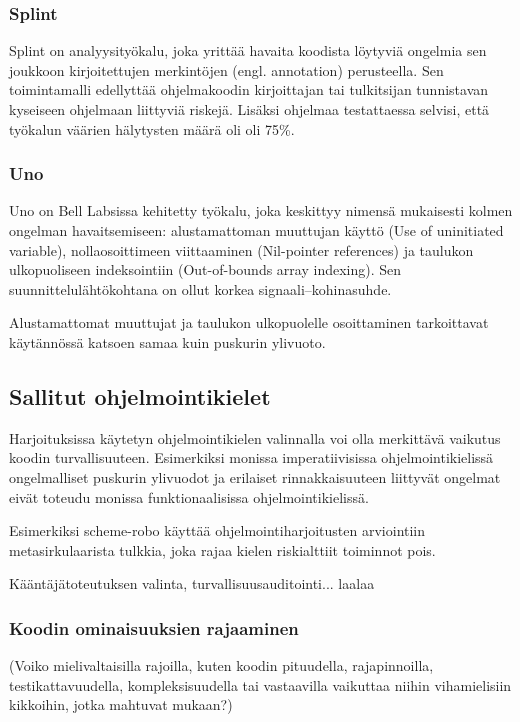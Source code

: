 \subsubsection{Splint}

Splint on analyysityökalu, joka yrittää havaita koodista löytyviä ongelmia sen
joukkoon kirjoitettujen merkintöjen (engl. annotation) perusteella. Sen
toimintamalli edellyttää ohjelmakoodin kirjoittajan tai tulkitsijan tunnistavan
kyseiseen ohjelmaan liittyviä riskejä. Lisäksi ohjelmaa testattaessa selvisi,
että työkalun väärien hälytysten määrä oli oli 75\%.

\subsubsection{Uno}

Uno on Bell Labsissa kehitetty työkalu, joka keskittyy nimensä mukaisesti kolmen
ongelman havaitsemiseen: alustamattoman muuttujan käyttö (Use of uninitiated
variable), nollaosoittimeen viittaaminen (Nil-pointer references) ja taulukon
ulkopuoliseen indeksointiin (Out-of-bounds array indexing). Sen
suunnittelulähtökohtana on ollut korkea signaali--kohinasuhde.

Alustamattomat muuttujat ja taulukon ulkopuolelle osoittaminen tarkoittavat
käytännössä katsoen samaa kuin puskurin ylivuoto.


\subsection{Sallitut ohjelmointikielet}

Harjoituksissa käytetyn ohjelmointikielen valinnalla voi olla merkittävä
vaikutus koodin turvallisuuteen. Esimerkiksi monissa imperatiivisissa
ohjelmointikielissä ongelmalliset puskurin ylivuodot ja erilaiset
rinnakkaisuuteen liittyvät ongelmat eivät toteudu monissa funktionaalisissa
ohjelmointikielissä.

Esimerkiksi scheme-robo käyttää ohjelmointiharjoitusten arviointiin
metasirkulaarista tulkkia, joka rajaa kielen riskialttiit toiminnot pois.

Kääntäjätoteutuksen valinta, turvallisuusauditointi... laalaa

\subsubsection{Koodin ominaisuuksien rajaaminen}

(Voiko mielivaltaisilla rajoilla, kuten koodin pituudella, rajapinnoilla,
testikattavuudella, kompleksisuudella tai vastaavilla vaikuttaa niihin
vihamielisiin kikkoihin, jotka mahtuvat mukaan?)


